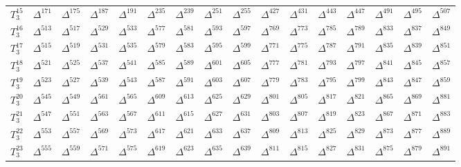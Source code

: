 \begin{center}
\begin{tabular}{|c||c|c|c|c|c|c|c|c|c|c|c|c|c|c|c|}
		$T_3^{15}$ & $\Delta^{171}$ & $\Delta^{175}$ & $\Delta^{187}$ & $\Delta^{191}$ & $\Delta^{235}$ & $\Delta^{239}$ & $\Delta^{251}$ & $\Delta^{255}$ & $\Delta^{427}$ & $\Delta^{431}$ & $\Delta^{443}$ & $\Delta^{447}$ & $\Delta^{491}$ & $\Delta^{495}$ & $\Delta^{507}$ \\
		$T_3^{16}$ & $\Delta^{513}$ & $\Delta^{517}$ & $\Delta^{529}$ & $\Delta^{533}$ & $\Delta^{577}$ & $\Delta^{581}$ & $\Delta^{593}$ & $\Delta^{597}$ & $\Delta^{769}$ & $\Delta^{773}$ & $\Delta^{785}$ & $\Delta^{789}$ & $\Delta^{833}$ & $\Delta^{837}$ & $\Delta^{849}$ \\
		$T_3^{17}$ & $\Delta^{515}$ & $\Delta^{519}$ & $\Delta^{531}$ & $\Delta^{535}$ & $\Delta^{579}$ & $\Delta^{583}$ & $\Delta^{595}$ & $\Delta^{599}$ & $\Delta^{771}$ & $\Delta^{775}$ & $\Delta^{787}$ & $\Delta^{791}$ & $\Delta^{835}$ & $\Delta^{839}$ & $\Delta^{851}$ \\
		$T_3^{18}$ & $\Delta^{521}$ & $\Delta^{525}$ & $\Delta^{537}$ & $\Delta^{541}$ & $\Delta^{585}$ & $\Delta^{589}$ & $\Delta^{601}$ & $\Delta^{605}$ & $\Delta^{777}$ & $\Delta^{781}$ & $\Delta^{793}$ & $\Delta^{797}$ & $\Delta^{841}$ & $\Delta^{845}$ & $\Delta^{857}$ \\
		$T_3^{19}$ & $\Delta^{523}$ & $\Delta^{527}$ & $\Delta^{539}$ & $\Delta^{543}$ & $\Delta^{587}$ & $\Delta^{591}$ & $\Delta^{603}$ & $\Delta^{607}$ & $\Delta^{779}$ & $\Delta^{783}$ & $\Delta^{795}$ & $\Delta^{799}$ & $\Delta^{843}$ & $\Delta^{847}$ & $\Delta^{859}$ \\
		$T_3^{20}$ & $\Delta^{545}$ & $\Delta^{549}$ & $\Delta^{561}$ & $\Delta^{565}$ & $\Delta^{609}$ & $\Delta^{613}$ & $\Delta^{625}$ & $\Delta^{629}$ & $\Delta^{801}$ & $\Delta^{805}$ & $\Delta^{817}$ & $\Delta^{821}$ & $\Delta^{865}$ & $\Delta^{869}$ & $\Delta^{881}$ \\
		$T_3^{21}$ & $\Delta^{547}$ & $\Delta^{551}$ & $\Delta^{563}$ & $\Delta^{567}$ & $\Delta^{611}$ & $\Delta^{615}$ & $\Delta^{627}$ & $\Delta^{631}$ & $\Delta^{803}$ & $\Delta^{807}$ & $\Delta^{819}$ & $\Delta^{823}$ & $\Delta^{867}$ & $\Delta^{871}$ & $\Delta^{883}$ \\
		$T_3^{22}$ & $\Delta^{553}$ & $\Delta^{557}$ & $\Delta^{569}$ & $\Delta^{573}$ & $\Delta^{617}$ & $\Delta^{621}$ & $\Delta^{633}$ & $\Delta^{637}$ & $\Delta^{809}$ & $\Delta^{813}$ & $\Delta^{825}$ & $\Delta^{829}$ & $\Delta^{873}$ & $\Delta^{877}$ & $\Delta^{889}$ \\
		$T_3^{23}$ & $\Delta^{555}$ & $\Delta^{559}$ & $\Delta^{571}$ & $\Delta^{575}$ & $\Delta^{619}$ & $\Delta^{623}$ & $\Delta^{635}$ & $\Delta^{639}$ & $\Delta^{811}$ & $\Delta^{815}$ & $\Delta^{827}$ & $\Delta^{831}$ & $\Delta^{875}$ & $\Delta^{879}$ & $\Delta^{891}$ \\

\end{tabular}
\end{center}
